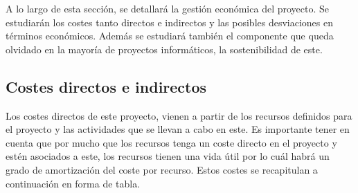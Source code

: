 
A lo largo de esta sección, se detallará la gestión económica del proyecto. Se estudiarán los costes tanto directos e indirectos y las posibles desviaciones en términos económicos. Además se estudiará también el componente que queda olvidado en la mayoría de proyectos informáticos, la sostenibilidad de este.

\subsection{Costes directos e indirectos}

Los costes directos de este proyecto, vienen a partir de los recursos definidos para el proyecto y las actividades que se llevan a cabo en este. Es importante tener en cuenta que por mucho que los recursos tenga un coste directo en el proyecto y estén asociados a este, los recursos tienen una vida útil por lo cuál habrá un grado de amortización del coste por recurso. Estos costes se recapitulan a continuación en forma de tabla.

